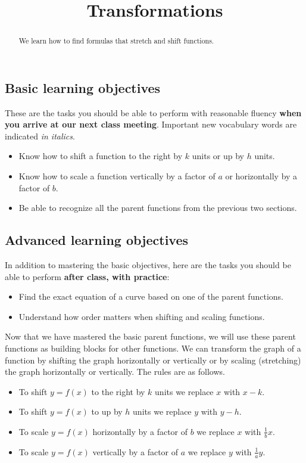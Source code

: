 \documentclass{ximera}
\title{Transformations}
\begin{document}
\begin{abstract}
We learn how to find formulas that stretch and shift functions.
\end{abstract}
\maketitle

\subsection*{Basic learning objectives}

These are the tasks you should be able to perform with reasonable fluency \textbf{when you arrive at our next class meeting}. Important new vocabulary words are indicated \emph{in italics}. 

\begin{itemize}
	\item Know how to shift a function to the right by $k$ units or up by $h$ units.
	\item Know how to scale a function vertically by a factor of $a$ or horizontally by a factor of $b$.
	\item Be able to recognize all the parent functions from the previous two sections.
\end{itemize}

\subsection*{Advanced learning objectives}

In addition to mastering the basic objectives, here are the tasks you should be able to perform \textbf{after class, with practice}: 

\begin{itemize}
	\item Find the exact equation of a curve based on one of the parent functions.
    \item Understand how order matters when shifting and scaling functions.
\end{itemize}

Now that we have mastered the basic parent functions, we will use these parent functions as building blocks for other functions. We can transform the graph of a function by shifting the graph horizontally or vertically or by scaling (stretching) the graph horizontally or vertically. The rules are as follows.

\begin{itemize}
\item To shift $y=f(x)$ to the right by $k$ units we replace $x$ with $x-k$.
\item To shift $y=f(x)$ to up by $h$ units we replace $y$ with $y-h$.
\item To scale $y=f(x)$ horizontally by a factor of $b$ we replace $x$ with $\frac{1}{b} x$.
\item To scale $y=f(x)$ vertically by a factor of $a$ we replace $y$ with $\frac{1}{a} y$.
\end{itemize}
\end{document}
